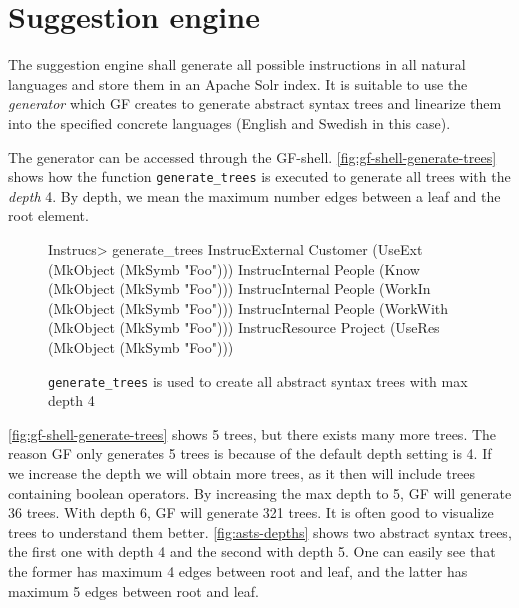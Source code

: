 \section{Suggestion engine}
The suggestion engine shall generate all possible instructions in all natural languages and store them in an Apache Solr index. It is suitable to use the \emph{generator} which GF creates to generate abstract syntax trees and linearize them into the specified concrete languages (English and Swedish in this case).

The generator can be accessed through the GF-shell.  \autoref{fig:gf-shell-generate-trees} shows how the function \texttt{generate\_trees} is executed to generate all trees with the \emph{depth} 4. By depth, we mean the maximum number edges between a leaf and the root element.

\begin{figure}[H]
\begin{terminal}
Instrucs> generate_trees
InstrucExternal Customer (UseExt (MkObject (MkSymb "Foo")))
InstrucInternal People (Know (MkObject (MkSymb "Foo")))
InstrucInternal People (WorkIn (MkObject (MkSymb "Foo")))
InstrucInternal People (WorkWith (MkObject (MkSymb "Foo")))
InstrucResource Project (UseRes (MkObject (MkSymb "Foo")))
\end{terminal}
\caption{\texttt{generate\_trees} is used to create all abstract syntax trees with max depth 4\label{fig:gf-shell-generate-trees}}
\end{figure}

\autoref{fig:gf-shell-generate-trees} shows 5 trees, but there exists many more trees. The reason GF only generates 5 trees is because of the default depth setting is 4. If we increase the depth we will obtain more trees, as it then will include trees containing boolean operators. By increasing the max depth to 5, GF will generate 36 trees. With depth 6, GF will generate 321 trees.
\newline
\newline
It is often good to visualize trees to understand them better. \autoref{fig:asts-depths} shows two abstract syntax trees, the first one with depth 4 and the second with depth 5. One can easily see that the former has maximum 4 edges between root and leaf, and the latter has maximum 5 edges between root and leaf.

